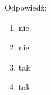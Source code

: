 Odpowiedź:
\begin{enumerate}
    \item nie
    \item nie
    \item tak
    \item tak
\end{enumerate}